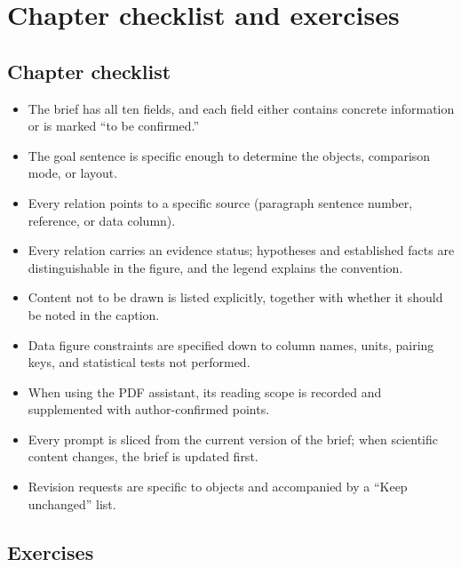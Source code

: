 \section{Chapter checklist and exercises}

\subsection*{Chapter checklist}

\begin{itemize}
\item The brief has all ten fields, and each field either contains concrete information or is marked ``to be confirmed.''
\item The goal sentence is specific enough to determine the objects, comparison mode, or layout.
\item Every relation points to a specific source (paragraph sentence number, reference, or data column).
\item Every relation carries an evidence status; hypotheses and established facts are distinguishable in the figure, and the legend explains the convention.
\item Content not to be drawn is listed explicitly, together with whether it should be noted in the caption.
\item Data figure constraints are specified down to column names, units, pairing keys, and statistical tests not performed.
\item When using the PDF assistant, its reading scope is recorded and supplemented with author-confirmed points.
\item Every prompt is sliced from the current version of the brief; when scientific content changes, the brief is updated first.
\item Revision requests are specific to objects and accompanied by a ``Keep unchanged'' list.
\end{itemize}

\subsection*{Exercises}


